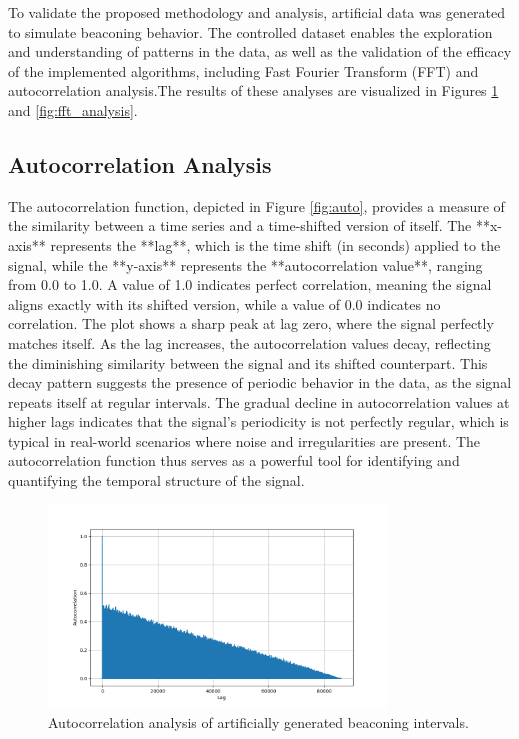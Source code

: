 To validate the proposed methodology and analysis, artificial data was generated to simulate beaconing behavior. The controlled dataset enables the exploration and understanding of patterns in the data, as well as the validation of the efficacy of the implemented algorithms, including Fast Fourier Transform (FFT) and autocorrelation analysis.The results of these analyses are visualized in Figures \ref{fig:autocorrelation10} and \ref{fig:fft_analysis}.

\subsection{Autocorrelation Analysis}

The autocorrelation function, depicted in Figure \ref{fig:auto}, provides a measure of the similarity between a time series and a time-shifted version of itself. The **x-axis** represents the **lag**, which is the time shift (in seconds) applied to the signal, while the **y-axis** represents the **autocorrelation value**, ranging from 0.0 to 1.0. A value of 1.0 indicates perfect correlation, meaning the signal aligns exactly with its shifted version, while a value of 0.0 indicates no correlation. The plot shows a sharp peak at lag zero, where the signal perfectly matches itself. As the lag increases, the autocorrelation values decay, reflecting the diminishing similarity between the signal and its shifted counterpart. This decay pattern suggests the presence of periodic behavior in the data, as the signal repeats itself at regular intervals. The gradual decline in autocorrelation values at higher lags indicates that the signal's periodicity is not perfectly regular, which is typical in real-world scenarios where noise and irregularities are present. The autocorrelation function thus serves as a powerful tool for identifying and quantifying the temporal structure of the signal.

\begin{figure}
    \centering
    \includegraphics[width=0.8\textwidth]{../Thesis_Docs/media/auto.png}
    \caption{Autocorrelation analysis of artificially generated beaconing intervals.}
    \label{fig:autocorrelation10}
\end{figure}

